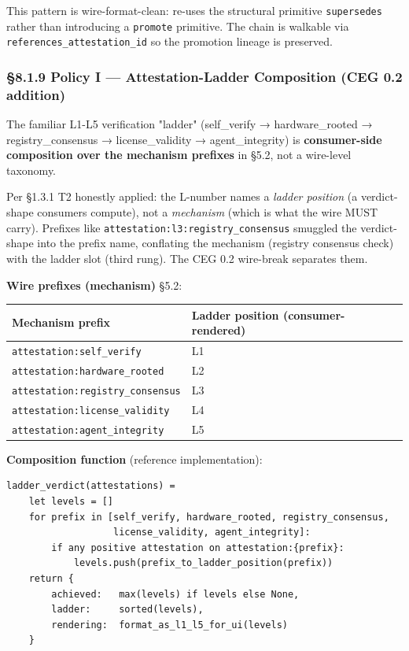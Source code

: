 \documentclass[10pt]{article}
\begin{document}
This pattern is wire-format-clean: re-uses the structural primitive \texttt{supersedes} rather than introducing a \texttt{promote} primitive. The chain is walkable via \texttt{references\_attestation\_id} so the promotion lineage is preserved.


\subsubsection*{§8.1.9 Policy I — Attestation-Ladder Composition (CEG 0.2 addition)}


The familiar L1-L5 verification "ladder" (self\_verify → hardware\_rooted → registry\_consensus → license\_validity → agent\_integrity) is \textbf{consumer-side composition over the mechanism prefixes} in §5.2, not a wire-level taxonomy.


Per §1.3.1 T2 honestly applied: the L-number names a \textit{ladder position} (a verdict-shape consumers compute), not a \textit{mechanism} (which is what the wire MUST carry). Prefixes like \texttt{attestation:l3:registry\_consensus} smuggled the verdict-shape into the prefix name, conflating the mechanism (registry consensus check) with the ladder slot (third rung). The CEG 0.2 wire-break separates them.


\textbf{Wire prefixes (mechanism)} §5.2:


{\footnotesize
\begin{longtable}{|p{8.0cm}|p{8.0cm}|}\hline
\textbf{Mechanism prefix} & \textbf{Ladder position (consumer-rendered)} \\ \hline\endhead
\texttt{attestation:self\_verify} & L1 \\ \hline
\texttt{attestation:hardware\_rooted} & L2 \\ \hline
\texttt{attestation:registry\_consensus} & L3 \\ \hline
\texttt{attestation:license\_validity} & L4 \\ \hline
\texttt{attestation:agent\_integrity} & L5 \\ \hline
\end{longtable}}


\textbf{Composition function} (reference implementation):


\begin{lstlisting}
ladder_verdict(attestations) =
    let levels = []
    for prefix in [self_verify, hardware_rooted, registry_consensus,
                   license_validity, agent_integrity]:
        if any positive attestation on attestation:{prefix}:
            levels.push(prefix_to_ladder_position(prefix))
    return {
        achieved:   max(levels) if levels else None,
        ladder:     sorted(levels),
        rendering:  format_as_l1_l5_for_ui(levels)
    }
\end{lstlisting}
\end{document}
